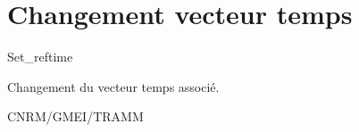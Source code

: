 %
\section{Changement vecteur temps}

  {\sf Set\_reftime}

Changement du vecteur temps associ\'e.

\bigskip





CNRM/GMEI/TRAMM

